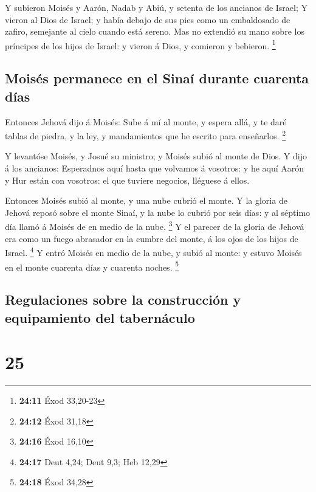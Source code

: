  Y subieron Moisés y Aarón, Nadab y Abiú, y setenta de los
ancianos de Israel;  Y vieron al Dios de Israel; y había
debajo de sus pies como un embaldosado de zafiro, semejante al cielo
cuando está sereno.  Mas no extendió su mano sobre los
príncipes de los hijos de Israel: y vieron á Dios, y comieron y
bebieron. \footnote{\textbf{24:11} Éxod 33,20-23}

\hypertarget{moisuxe9s-permanece-en-el-sinauxed-durante-cuarenta-duxedas}{%
\subsection{Moisés permanece en el Sinaí durante cuarenta
días}\label{moisuxe9s-permanece-en-el-sinauxed-durante-cuarenta-duxedas}}

 Entonces Jehová dijo á Moisés: Sube á mí al monte, y
espera allá, y te daré tablas de piedra, y la ley, y mandamientos que he
escrito para enseñarlos. \footnote{\textbf{24:12} Éxod 31,18}

 Y levantóse Moisés, y Josué su ministro; y Moisés subió al
monte de Dios.  Y dijo á los ancianos: Esperadnos aquí
hasta que volvamos á vosotros: y he aquí Aarón y Hur están con vosotros:
el que tuviere negocios, lléguese á ellos.

 Entonces Moisés subió al monte, y una nube cubrió el
monte.  Y la gloria de Jehová reposó sobre el monte Sinaí,
y la nube lo cubrió por seis días: y al séptimo día llamó á Moisés de en
medio de la nube. \footnote{\textbf{24:16} Éxod 16,10}  Y
el parecer de la gloria de Jehová era como un fuego abrasador en la
cumbre del monte, á los ojos de los hijos de Israel. \footnote{\textbf{24:17}
  Deut 4,24; Deut 9,3; Heb 12,29}  Y entró Moisés en medio
de la nube, y subió al monte: y estuvo Moisés en el monte cuarenta días
y cuarenta noches. \footnote{\textbf{24:18} Éxod 34,28}

\hypertarget{regulaciones-sobre-la-construcciuxf3n-y-equipamiento-del-tabernuxe1culo}{%
\subsection{Regulaciones sobre la construcción y equipamiento del
tabernáculo}\label{regulaciones-sobre-la-construcciuxf3n-y-equipamiento-del-tabernuxe1culo}}

\hypertarget{section-24}{%
\section{25}\label{section-24}}

